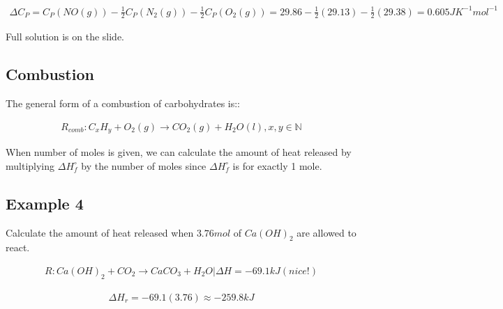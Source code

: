 \documentclass[12pt]{book}
\begin{document}
\begin{align*}
    \Delta C_P=C_P(NO(g))-\frac{1}{2}C_P(N_2(g))-\frac{1}{2}C_P(O_2(g))=29.86-\frac{1}{2}(29.13)-\frac{1}{2}(29.38)=0.605 JK^{-1}mol^{-1}
\end{align*}

Full solution is on the slide.

\subsection*{Combustion}

The general form of a combustion of carbohydrates 
is::

\begin{align*}
    R_{comb}: C_x H_y+O_2(g)\rightarrow CO_2(g)+H_2O(l), x,y\in \mathbb{N}
\end{align*}

When number of moles is given, we can calculate the amount of heat released by multiplying $\Delta H_f^{\circ}$ by the number of moles since $\Delta H_f^{\circ}$ is for exactly 1 mole.

\subsection*{Example 4}
Calculate the amount of heat released when $3.76mol$ of
$Ca(OH)_2$ are allowed to react.

\begin{align*}
    R: Ca(OH)_2+CO_2\rightarrow CaCO_3+H_2O|\Delta H=-69.1 kJ(nice!)
\end{align*}

\begin{align*}
    \Delta H_r=-69.1(3.76)\approx -259.8kJ
\end{align*}
\end{document}
